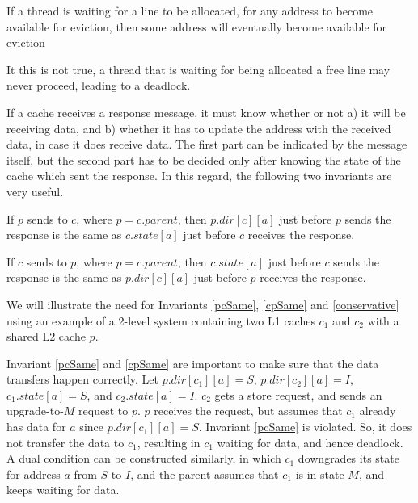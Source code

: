 \begin{theorem}
If a thread is waiting for a line to be allocated, \ie for any address to become
available for eviction, then some address will eventually become available for
eviction
\label{evictDead}
\end{theorem}

It this is not true, a thread that is waiting for being allocated a free line
may never proceed, leading to a deadlock.

If a cache receives a response message, it must know whether or not a) it will
be receiving data, and b) whether it has to update the address with the received
data, in case it does receive data. The first part can be indicated by the
message itself, but the second part has to be decided only after knowing the
state of the cache which sent the response. In this regard, the following two
invariants are very useful.

\begin{theorem}
If $p$ sends  to $c$, where $p = c.parent$, then $p.dir[c][a]$
just before $p$ sends the response is the same as $c.state[a]$ just before $c$
receives the response.
\label{pcSame}
\end{theorem}

\begin{theorem}
If $c$ sends  to $p$, where $p = c.parent$, then $c.state[a]$
just before $c$ sends the response is the same as $p.dir[c][a]$ just before $p$
receives the response.
\label{cpSame}
\end{theorem}

We will illustrate the need for Invariants \ref{pcSame}, \ref{cpSame} and
\ref{conservative} using an example of a 2-level system containing two L1
caches $c_1$ and $c_2$ with a shared L2 cache $p$.

Invariant \ref{pcSame} and \ref{cpSame} are important to make sure that the
data transfers happen correctly. Let $p.dir[c_1][a] = S$, $p.dir[c_2][a] = I$,
$c_1.state[a] = S$, and $c_2.state[a] = I$. $c_2$ gets a store request, and
sends an upgrade-to-$M$ request to $p$. $p$ receives the request, but assumes that
$c_1$ already has data for $a$ since $p.dir[c_1][a] = S$. Invariant
\ref{pcSame} is violated. So, it does not transfer the data to $c_1$, resulting
in $c_1$ waiting for data, and hence deadlock. A dual condition can be
constructed similarly, in which $c_1$ downgrades its state for address $a$ from
$S$ to $I$, and the parent assumes that $c_1$ is in state $M$, and keeps
waiting for data.

